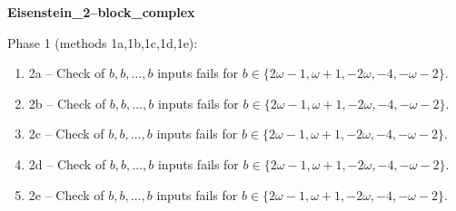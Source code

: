 \begin{exmp}
\label{ex:compareAC}

\textbf{Eisenstein\_2--block\_complex}

Phase 1 (methods 1a,\allowbreak  1b,\allowbreak  1c,\allowbreak  1d,\allowbreak  1e):
\begin{enumerate}[ ]
\item  2a -- Check of $b,\allowbreak b,\allowbreak \dots,\allowbreak b$ inputs fails for $b\in \{2\omega - 1,\allowbreak  \omega + 1,\allowbreak  -2\omega,\allowbreak  -4,\allowbreak  -\omega - 2\}$.
\item  2b -- Check of $b,\allowbreak b,\allowbreak \dots,\allowbreak b$ inputs fails for $b\in \{2\omega - 1,\allowbreak  \omega + 1,\allowbreak  -2\omega,\allowbreak  -4,\allowbreak  -\omega - 2\}$.
\item  2c -- Check of $b,\allowbreak b,\allowbreak \dots,\allowbreak b$ inputs fails for $b\in \{2\omega - 1,\allowbreak  \omega + 1,\allowbreak  -2\omega,\allowbreak  -4,\allowbreak  -\omega - 2\}$.
\item  2d -- Check of $b,\allowbreak b,\allowbreak \dots,\allowbreak b$ inputs fails for $b\in \{2\omega - 1,\allowbreak  \omega + 1,\allowbreak  -2\omega,\allowbreak  -4,\allowbreak  -\omega - 2\}$.
\item  2e -- Check of $b,\allowbreak b,\allowbreak \dots,\allowbreak b$ inputs fails for $b\in \{2\omega - 1,\allowbreak  \omega + 1,\allowbreak  -2\omega,\allowbreak  -4,\allowbreak  -\omega - 2\}$.
\end{enumerate}


\end{exmp}





